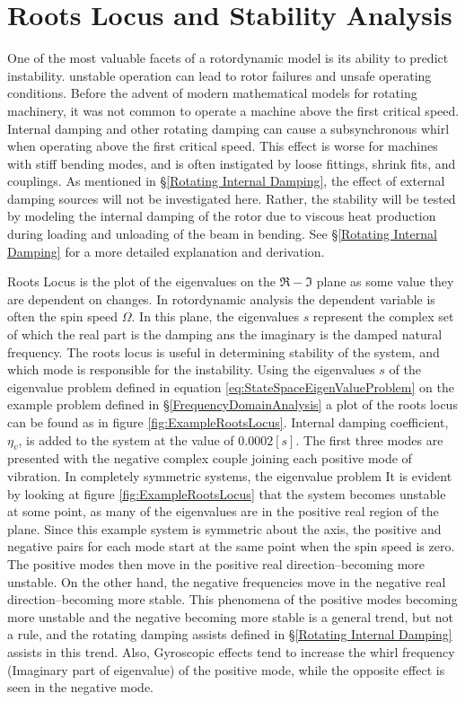 \section{Roots Locus and Stability Analysis}
One of the most valuable facets of a rotordynamic model is its ability to predict instability. unstable operation can lead to rotor failures and unsafe operating conditions. Before the advent of modern mathematical models for rotating machinery, it was not common to operate a machine above the first critical speed. Internal damping and other rotating damping can cause a subsynchronous whirl when operating above the first critical speed. This effect is worse for machines with stiff bending modes, and is often instigated by loose fittings, shrink fits, and couplings. As mentioned in \S\ref{Rotating Internal Damping}, the effect of external damping sources will not be investigated here. Rather, the stability will be tested by modeling the internal damping of the rotor due to viscous heat production during loading and unloading of the beam in bending. See \S\ref{Rotating Internal Damping} for a more detailed explanation and derivation.\par 
Roots Locus is the plot of the eigenvalues on the $ \Re-\Im $ plane as some value they are dependent on changes. In rotordynamic analysis the dependent variable is often the spin speed $ \Omega $. In this plane, the eigenvalues $ s $ represent the complex set of which the real part is the damping ans the imaginary is the damped natural frequency. The roots locus is useful in determining stability of the system, and which mode is responsible for the instability. Using the eigenvalues $ s $ of the eigenvalue problem defined in equation \eqref{eq:StateSpaceEigenValueProblem} on the example problem defined in \S\ref{FrequencyDomainAnalysis} a plot of the roots locus can be found as in figure \ref{fig:ExampleRootsLocus}. Internal damping coefficient, $ \eta_v $, is added to the system at the value of $ 0.0002[s] $. The first three modes are presented with the negative complex couple joining each positive mode of vibration. In completely symmetric systems, the eigenvalue problem  It is evident by looking at figure \ref{fig:ExampleRootsLocus} that the system becomes unstable at some point, as many of the eigenvalues are in the positive real region of the plane. Since this example system is symmetric about the axis, the positive and negative pairs for each mode start at the same point when the spin speed is zero. The positive modes then move in the positive real direction--becoming more unstable. On the other hand, the negative frequencies move in the negative real direction--becoming more stable. This phenomena of the positive modes becoming more unstable and the negative becoming more stable is a general trend, but not a rule, and the rotating damping assists defined in \S\ref{Rotating Internal Damping} assists in this trend. Also, Gyroscopic effects tend to increase the whirl frequency (Imaginary part of eigenvalue) of the positive mode, while the opposite effect is seen in the negative mode.\par 
